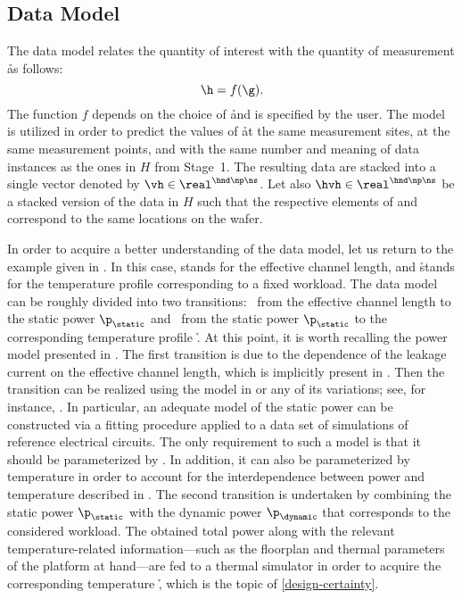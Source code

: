 \subsection{Data Model}

The data model relates the quantity of interest \g with the quantity of
measurement \h as follows:
\[
  \h = f(\g).
\]
The function $f$ depends on the choice of \h and is specified by the user. The
model is utilized in order to predict the values of \h at the same measurement
sites, at the same measurement points, and with the same number and meaning of
data instances as the ones in $H$ from Stage~1. The resulting data are stacked
into a single vector denoted by $\vh \in \real^{\hnd \np \ns}$. Let also $\hvh
\in \real^{\hnd \np \ns}$ be a stacked version of the data in $H$ such that the
respective elements of \vh and \hvh correspond to the same locations on the
wafer.

In order to acquire a better understanding of the data model, let us return to
the example given in . In this case, \g stands for the
effective channel length, and \h stands for the temperature profile
corresponding to a fixed workload. The data model can be roughly divided into
two transitions: \one~from the effective channel length \g to the static power
$\p_\static$ and \two~from the static power $\p_\static$ to the corresponding
temperature profile \h. At this point, it is worth recalling the power model
presented in . The first transition is due to the dependence
of the leakage current on the effective channel length, which is implicitly
present in . Then the transition can be realized using the
model in  or any of its variations; see, for instance,
\cite{chandrakasan2000, srivastava2010, juan2012}. In particular, an adequate
model of the static power can be constructed via a fitting procedure applied to
a data set of  simulations of reference electrical circuits. The only
requirement to such a model is that it should be parameterized by \g. In
addition, it can also be parameterized by temperature in order to account for
the interdependence between power and temperature described in
. The second transition is undertaken by combining the static
power $\p_\static$ with the dynamic power $\p_\dynamic$ that corresponds to the
considered workload. The obtained total power along with the relevant
temperature-related information---such as the floorplan and thermal parameters
of the platform at hand---are fed to a thermal simulator in order to acquire the
corresponding temperature \h, which is the topic of \cref{design-certainty}.

